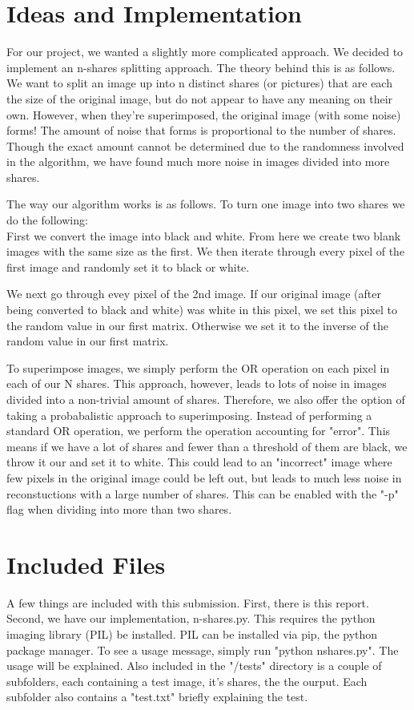 \documentclass{article}
\begin{document}
\section*{Ideas and Implementation}
For our project, we wanted a slightly more complicated approach.  We decided to implement an n-shares splitting approach.  The theory behind this is as follows.  We want to split an image up into n distinct shares (or pictures) that are each the size of the original image, but do not appear to have any meaning on their own.  However, when they're superimposed, the original image (with some noise) forms!  The amount of noise that forms is proportional to the number of shares.  Though the exact amount cannot be determined due to the randomness involved in the algorithm, we have found much more noise in images divided into more shares.  
\\\par
The way our algorithm works is as follows.  To turn one image into two shares we do the following:
\\
First we convert the image into black and white.  From here we create two blank images with the same size as the first.  We then iterate through every pixel of the first image and randomly set it to black or white.  \\
\par We next go through evey pixel of the 2nd image.  If our original image (after being converted to black and white) was white in this pixel, we set this pixel to the random value in our first matrix.  Otherwise we set it to the inverse of the random value in our first matrix.
\\ \par
To superimpose images, we simply perform the OR operation on each pixel in each of our N shares.  This approach, however, leads to lots of noise in images divided into a non-trivial amount of shares.  Therefore, we also offer the option of taking a probabalistic approach to superimposing.  Instead of performing a standard OR operation, we perform the operation accounting for "error".  This means if we have a lot of shares and fewer than a threshold of them are black, we throw it our and set it to white.  This could lead to an "incorrect" image where few pixels in the original image could be left out, but leads to much less noise in reconstuctions with a large number of shares.  This can be enabled with the "-p" flag when dividing into more than two shares.
\section*{Included Files}
A few things are included with this submission.  First, there is this report.  Second, we have our implementation, n-shares.py. This requires the python imaging library (PIL) be installed.  PIL can be installed via pip, the python package manager.  To see a usage message, simply run "python nshares.py".  The usage will be explained.  Also included in the "/tests" directory is a couple of subfolders, each containing a test image, it's shares, the the ourput.  Each subfolder also contains a "test.txt" briefly explaining the test.  
\end{document}
